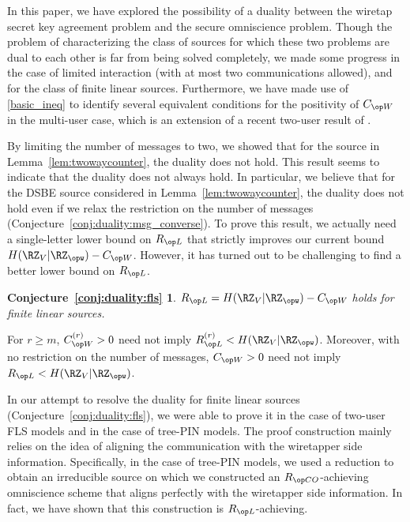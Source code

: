 In this paper, we have explored the possibility of a duality between the wiretap secret key agreement problem and the secure omniscience problem. Though the problem of characterizing the class of sources for which these two problems are dual to each other is far from being solved completely, we made some progress in the case of limited interaction (with at most two communications allowed), and for the class of finite linear sources. Furthermore, we have made use of \eqref{basic_ineq} to identify several equivalent conditions for the positivity of $\wskc$ in the multi-user case, which is an extension of a recent two-user result of \cite{amin2020}. 



By limiting the number of messages to two, we showed that for the source in Lemma~\ref{lem:twowaycounter}, the duality does not hold. This result seems to indicate that the duality does not always hold. 
In particular, we believe that for the DSBE source  considered in Lemma~\ref{lem:twowaycounter}, the duality does not hold even if we relax the restriction on the number of messages (Conjecture~\ref{conj:duality:msg_converse}). To prove this result, we actually  need a single-letter lower bound on $\rl$ that strictly improves our current bound $H(\RZ_V|\RZ_{\opw}) - \wskc$.  However, it has turned out to be challenging to find a better lower bound on $\rl$. 

\newtheorem*{C1}{Conjecture~\ref{conj:duality:fls}}
\begin{C1}
$\rl = H(\RZ_V|\RZ_{\opw}) - \wskc$ holds for finite linear sources.
\end{C1}

\begin{Conjecture}\label{conj:duality:msg_converse}
For $r\geq m$, $\wskc^{(r)}>0$ need not imply $\rl^{(r)} < H(\RZ_V|\RZ_{\opw})$. Moreover, with no restriction on the number of messages, $\wskc>0$ need not imply $\rl < H(\RZ_V|\RZ_{\opw})$.
\end{Conjecture}



In our attempt to resolve the duality for finite linear sources (Conjecture~\ref{conj:duality:fls}), we were able to prove it in the case of two-user FLS models and in the case of tree-PIN models. The proof construction mainly relies on the idea of aligning the communication with the wiretapper side information. Specifically, in the case of tree-PIN models, we used a reduction to obtain an irreducible source on which we constructed an $\rco$-achieving omniscience scheme that aligns perfectly with the wiretapper side information. In fact, we have shown that this construction is $\rl$-achieving. 

